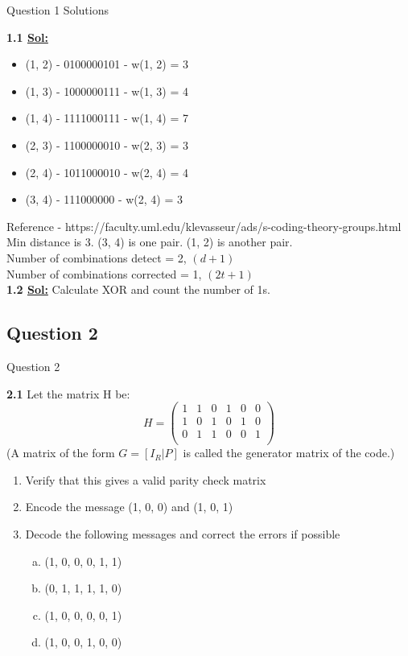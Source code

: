 \documentclass[xcolor=svgnames]{beamer}
\begin{document}
\begin{frame}{Question 1 Solutions}
\footnotesize{
    \textbf{1.1 \underline{Sol:}}
    \begin{itemize}
        \item (1, 2) - 0100000101 - w(1, 2) = 3
        \item (1, 3) - 1000000111 - w(1, 3) = 4
        \item (1, 4) - 1111000111 - w(1, 4) = 7
        \item (2, 3) - 1100000010 - w(2, 3) = 3
        \item (2, 4) - 1011000010 - w(2, 4) = 4
        \item (3, 4) - 111000000 - w(2, 4) = 3
    \end{itemize}
        Reference - https://faculty.uml.edu/klevasseur/ads/s-coding-theory-groups.html    
    Min distance is 3. (3, 4) is one pair. (1, 2) is another pair. \\
    Number of combinations detect = 2, $(d + 1)$\\
    Number of combinations corrected = 1, $(2t + 1)$\\
    
    \textbf{1.2 \underline{Sol:}}
    Calculate XOR and count the number of 1s.
    }
\end{frame}

\subsection{Question 2}

\begin{frame}{Question 2}
    \footnotesize{
    \textbf{2.1} Let the matrix H be:
    \[
        H = \begin{pmatrix} 
            1 & 1 & 0 & 1 & 0 & 0 \\
            1 & 0 & 1 & 0 & 1 & 0 \\
            0 & 1 & 1 & 0 & 0 & 1 \\
            \end{pmatrix}
    \]
    (A matrix of the form $G = [I_R|P]$ is called the generator matrix of the code.)
    \begin{enumerate}
        \item Verify that this gives a valid parity check matrix
        \item Encode the message (1, 0, 0) and (1, 0, 1)
        \item Decode the following messages and correct the errors if possible
            \begin{enumerate}[a.]
                \item (1, 0, 0, 0, 1, 1)
                \item (0, 1, 1, 1, 1, 0)
                \item (1, 0, 0, 0, 0, 1)
                \item (1, 0, 0, 1, 0, 0)
            \end{enumerate}
    \end{enumerate}
    }
\end{frame}
\end{document}
